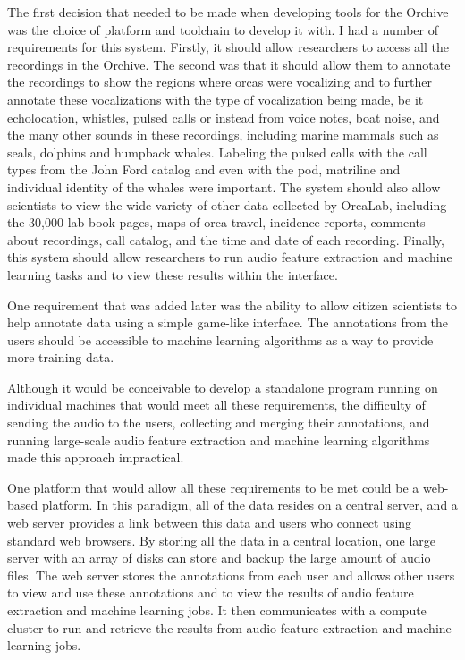 \documentclass[12pt,oneside]{book}
\begin{document}
The first decision that needed to be made when developing tools for
the Orchive was the choice of platform and toolchain to develop it
with.  I had a number of requirements for this system.  Firstly, it
should allow researchers to access all the recordings in the Orchive.
The second was that it should allow them to annotate the recordings to
show the regions where orcas were vocalizing and to further annotate
these vocalizations with the type of vocalization being made, be it
echolocation, whistles, pulsed calls or instead from voice notes, boat
noise, and the many other sounds in these recordings, including marine
mammals such as seals, dolphins and humpback whales.  Labeling the
pulsed calls with the call types from the John Ford catalog and even
with the pod, matriline and individual identity of the whales were
important.  The system should also allow scientists to view the wide
variety of other data collected by OrcaLab, including the 30,000 lab
book pages, maps of orca travel, incidence reports, comments about
recordings, call catalog, and the time and date of each recording.
Finally, this system should allow researchers to run audio feature
extraction and machine learning tasks and to view these results within
the interface.

One requirement that was added later was the ability to allow citizen
scientists to help annotate data using a simple game-like interface.
The annotations from the users should be accessible to machine
learning algorithms as a way to provide more training data.

Although it would be conceivable to develop a standalone
program running on individual machines that would meet all these
requirements, the difficulty of sending the audio to the users,
collecting and merging their annotations, and running large-scale
audio feature extraction and machine learning algorithms made this
approach impractical.

One platform that would allow all these requirements to be met could
be a web-based platform.  In this paradigm, all of the data resides on
a central server, and a web server provides a link between this data
and users who connect using standard web browsers.  By storing all the
data in a central location, one large server with an array of disks
can store and backup the large amount of audio files.  The web server
stores the annotations from each user and allows other users to view
and use these annotations and to view the results of audio feature
extraction and machine learning jobs.  It then communicates with a
compute cluster to run and retrieve the results from audio feature
extraction and machine learning jobs.
\end{document}

